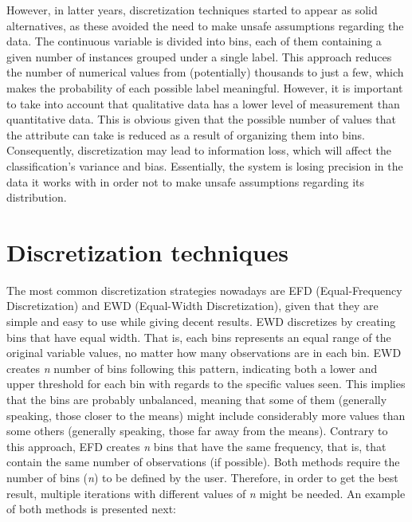 \documentclass{article}
\begin{document}
However, in latter years, discretization techniques started to appear as solid alternatives, as these avoided the need to make unsafe assumptions regarding the data. The continuous variable is divided into bins, each of them containing a given number of instances grouped under a single label. This approach reduces the number of numerical values from (potentially) thousands to just a few, which makes the probability of each possible label meaningful. However, it is important to take into account that qualitative data has a lower level of measurement than quantitative data. This is obvious given that the possible number of values that the attribute can take is reduced as a result of organizing them into bins. Consequently, discretization may lead to information loss, which will affect the classification's variance and bias. Essentially, the system is losing precision in the data it works with in order not to make unsafe assumptions regarding its distribution.

\section{Discretization techniques}

The most common discretization strategies nowadays are EFD (Equal-Frequency Discretization) and EWD (Equal-Width Discretization), given that they are simple and easy to use while giving decent results. EWD discretizes by creating bins that have equal width. That is, each bins represents an equal range of the original variable values, no matter how many observations are in each bin. EWD creates \emph{n} number of bins following this pattern, indicating both a lower and upper threshold for each bin with regards to the specific values seen. This implies that the bins are probably unbalanced, meaning that some of them (generally speaking, those closer to the means) might include considerably more values than some others (generally speaking, those far away from the means). Contrary to this approach, EFD creates \emph{n} bins that have the same frequency, that is, that contain the same number of observations (if possible). Both methods require the number of bins (\emph{n}) to be defined by the user. Therefore, in order to get the best result, multiple iterations with different values of \emph{n} might be needed. An example of both methods is presented next:
\end{document}
